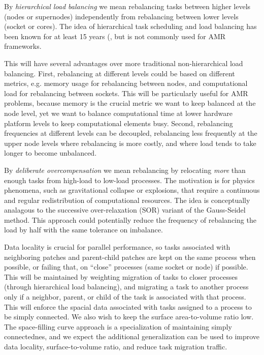 \documentclass{article}
\begin{document}
%
By \textit{hierarchical load balancing} we mean rebalancing tasks
between higher levels (nodes or supernodes) independently from
rebalancing between lower levels (socket or cores).  The idea of
hierarchical task scheduling and load balancing has been known for at
least 15 years (\cite{AhGh94}, but is not commonly used for AMR
frameworks.

This will have several advantages over more traditional
non-hierarchical load balancing.  First, rebalancing at different
levels could be based on different metrics, e.g. memory usage for
rebalancing between nodes, and computational load for rebalancing
between sockets.  This will be particularly useful for AMR problems,
because memory is the crucial metric we want to keep balanced at the
node level, yet we want to balance computational time at lower
hardware platform levels to keep computational elements busy.  Second,
rebalancing frequencies at different levels can be decoupled,
rebalancing less frequently at the upper node levels where rebalancing
is more costly, and where load tends to take longer to become
unbalanced.

%
By \textit{deliberate overcompensation} we mean rebalancing by
relocating \textit{more} than enough tasks from high-load to low-load
processes.  The motivation is for physics phenomena, such as
gravitational collapse or explosions, that require a continuous and
regular redistribution of computational resources.  The idea is
conceptually analagous to the successive over-relaxation (SOR) variant
of the Gauss-Seidel method.  This approach could potentially reduce
the frequency of rebalancing the load by half with the same tolerance
on imbalance.

%
Data locality is crucial for parallel performance, so tasks associated
with neighboring patches and parent-child patches are kept on the same
process when possible, or failing that, on ``close'' processes (same
socket or node) if possible.  This will be maintained by weighting
migration of tasks to closer processes (through hierarchical load
balancing), and migrating a task to another process only if a
neighbor, parent, or child of the task is associated with that
process.  This will enforce the spacial data associated with tasks
assigned to a process to be simply connected.  We also wish to keep
the surface area-to-volume ratio low.  The space-filling curve
approach is a specialization of maintaining simply connectednes, and
we expect the additional generalization can be used to improve data
locality, surface-to-volume ratio, and reduce task migration traffic.
\end{document}
